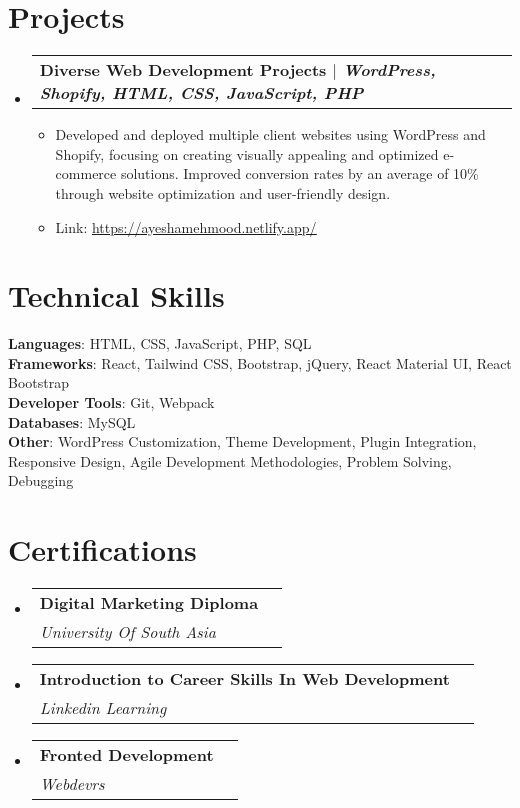 \documentclass[letterpaper,11pt]{article}
\makeatletter
\newcommand{\resumeItem}[1]{
  \item\small{
    {#1 \vspace{-2pt}}
  }
}
\newcommand{\resumeSubheading}[4]{
  \vspace{-2pt}\item
    \begin{tabular*}{0.97\textwidth}[t]{l@{\extracolsep{\fill}}r}
      \textbf{#1} & #2 \\
      \textit{\small#3} & \textit{\small #4} \\
    \end{tabular*}\vspace{-7pt}
}
\newcommand{\resumeProjectHeading}[2]{
    \item
    \begin{tabular*}{0.97\textwidth}{l@{\extracolsep{\fill}}r}
      \small#1 & #2 \\
    \end{tabular*}\vspace{-7pt}
}
\newcommand{\resumeSubHeadingListStart}{\begin{itemize}[leftmargin=0.15in, label={}]}
\newcommand{\resumeSubHeadingListEnd}{\end{itemize}}
\newcommand{\resumeItemListStart}{\begin{itemize}}
\newcommand{\resumeItemListEnd}{\end{itemize}\vspace{-5pt}}
\makeatother
\begin{document}
\section{Projects}
    \resumeSubHeadingListStart
      \resumeProjectHeading
          {\textbf{Diverse Web Development Projects $|$ \emph{WordPress, Shopify, HTML, CSS, JavaScript, PHP}}}{}
          \resumeItemListStart
            \resumeItem{Developed and deployed multiple client websites using WordPress and Shopify, focusing on creating visually appealing and optimized e-commerce solutions. Improved conversion rates by an average of 10\% through website optimization and user-friendly design.}
            \resumeItem{Link: \href{https://ayeshamehmood.netlify.app/}{\underline{https://ayeshamehmood.netlify.app/}}}
          \resumeItemListEnd
    \resumeSubHeadingListEnd

\section{Technical Skills}
 \begin{itemize}[leftmargin=0.15in, label={}]
    \small{\item{
     \textbf{Languages}: HTML, CSS, JavaScript, PHP, SQL \\
     \textbf{Frameworks}: React, Tailwind CSS, Bootstrap, jQuery, React Material UI, React Bootstrap \\
     \textbf{Developer Tools}: Git, Webpack \\
     \textbf{Databases}: MySQL \\
     \textbf{Other}: WordPress Customization, Theme Development, Plugin Integration, Responsive Design, Agile Development Methodologies, Problem Solving, Debugging
    }}
 \end{itemize}

\section{Certifications}
  \resumeSubHeadingListStart
    \resumeSubheading
      {Digital Marketing Diploma}{}
      {University Of South Asia}{}
    \resumeSubheading
      {Introduction to Career Skills In Web Development}{}
      {Linkedin Learning}{}
    \resumeSubheading
      {Fronted Development}{}
      {Webdevrs}{}
  \resumeSubHeadingListEnd

\end{document}
